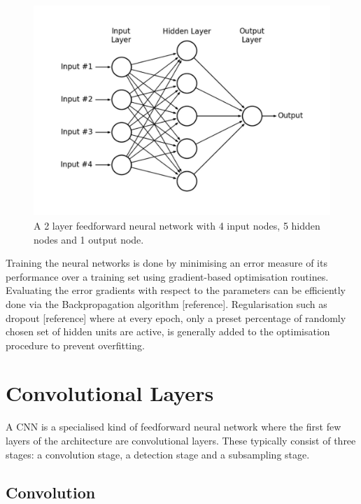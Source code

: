\begin{figure}
\centering
\includegraphics[trim=2cm 2cm 2cm 2cm, clip=true, height=80mm]{Chapter2/FF_Neural_Network.pdf}
\caption{A 2 layer feedforward neural network with 4 input nodes, 5 hidden nodes and 1 output node.}
\end{figure}

\noindent Training the neural networks is done by minimising an error measure of its performance over a training set using gradient-based optimisation routines. Evaluating the error gradients with respect to the parameters can be efficiently done via the Backpropagation algorithm [reference]. Regularisation such as dropout [reference] where at every epoch, only a preset percentage of randomly chosen set of hidden units are active, is generally added to the optimisation procedure to prevent overfitting.

\section{Convolutional Layers}

\noindent A CNN is a specialised kind of feedforward neural network where the first few layers of the architecture are convolutional layers. These typically consist of three stages: a convolution stage, a detection stage and a subsampling stage. 

\subsection{Convolution}

